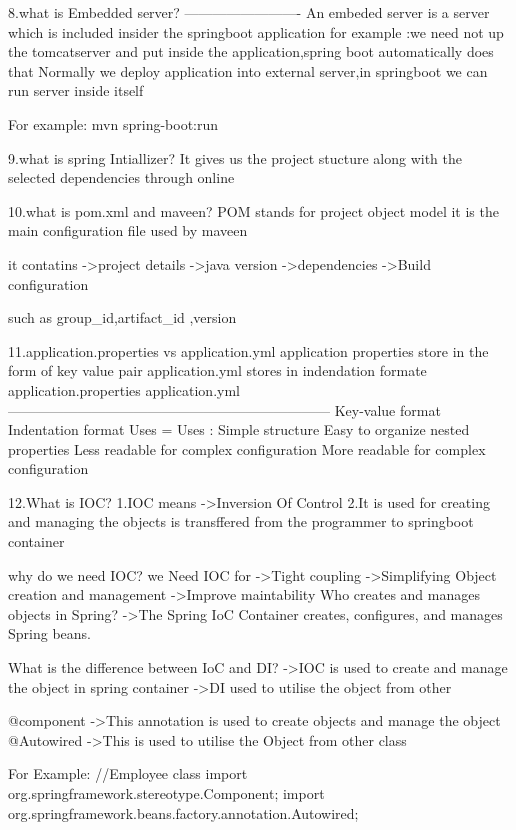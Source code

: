 	8.what is Embedded server?
	-------------------------
	An embeded server is a server which is included insider the springboot application
	for example :we need not up the tomcatserver and put inside the application,spring boot automatically does that
	Normally we deploy application into external server,in springboot we can run server inside itself
	
	For example:
		mvn spring-boot:run
		
	9.what is spring Intiallizer?
	It gives us the project stucture along with the selected dependencies through online
	
	10.what is pom.xml and maveen?
	POM stands for project object model
	it is the main configuration file used by maveen
	
	it contatins
		->project details 
		->java version
		->dependencies
		->Build configuration
			
		such as group_id,artifact_id ,version
		
	11.application.properties vs application.yml
	application properties store in the form of key value pair 
	application.yml stores in indendation formate
	application.properties	                  application.yml
	---------------------------------------------------------------------
		Key-value format	                    Indentation format
		Uses =	                                Uses :
		Simple structure	                    Easy to organize nested properties
		Less readable for complex configuration	More readable for complex configuration
		
		
		
		12.What is IOC?
		1.IOC means ->Inversion Of Control
		2.It is used for creating and managing the objects is transffered from the programmer to springboot container
		
	why do we need IOC?
		 we Need IOC for
			->Tight coupling 
			->Simplifying Object creation and management
			->Improve maintability
    Who creates and manages objects in Spring?
			->The Spring IoC Container creates, configures, and manages Spring beans.


	What is the difference between IoC and DI?
			->IOC is used to create and manage the object in spring container
			->DI used to utilise the object from other 
			
		@component ->This annotation is used to create objects and manage the object
		@Autowired ->This is used to utilise the Object from other class
		
	For Example:
	//Employee class
		import org.springframework.stereotype.Component;
		import org.springframework.beans.factory.annotation.Autowired;


